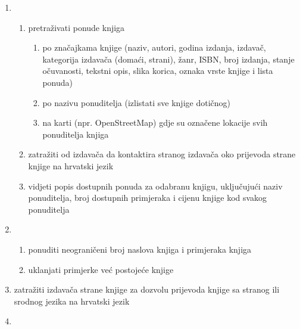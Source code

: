 \documentclass[12pt]{report}
\begin{document}
\begin{enumerate}
	\item  {}
	
	\begin{enumerate}
		
		\item pretraživati ponude knjiga
		\begin{enumerate}
			
			\item  po značajkama knjige (naziv, autori, godina izdanja, izdavač,
			kategorija izdavača (domaći, strani), žanr, ISBN, broj izdanja, stanje očuvanosti,
			tekstni opis, slika korica, oznaka vrste knjige i lista ponuda)
			\item  po nazivu ponuditelja (izlistati sve knjige dotičnog)
			\item na karti (npr. OpenStreetMap) gdje su označene lokacije svih ponuditelja knjiga
			
		\end{enumerate}
		\item  zatražiti od izdavača da kontaktira stranog izdavača oko prijevoda strane knjige na hrvatski jezik
		
		\item vidjeti popis dostupnih ponuda za odabranu knjigu, uključujući naziv ponuditelja, broj dostupnih primjeraka i cijenu knjige kod svakog ponuditelja
		
		
		
	\end{enumerate}
	
	\item  {}
	
	\begin{enumerate}
		
		\item ponuditi neograničeni broj naslova knjiga i primjeraka knjiga
		\item uklanjati primjerke već postojeće knjige 
		
	\end{enumerate}
	
	\item {}
	
	zatražiti izdavača strane knjige za dozvolu prijevoda knjige sa stranog ili srodnog jezika na hrvatski jezik
	
	\item {}
	

\end{enumerate}
\end{document}

